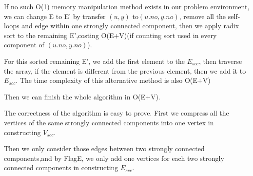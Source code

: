 \documentclass[oneside]{homework} %
\begin{document}
If no such O(1) memory manipulation method exists in our problem environment, we can change E to E' by transfer $(\mathit{u},\mathit{y})$ to$(\mathit{u}.no,\mathit{y}.no)$, remove all the self-loops and edge within one strongly connected component, then we apply radix sort to the remaining E',costing O(E+V)(if counting sort used in every component of $(\mathit{u}.no,\mathit{y}.no)$).

For this sorted remaining E', we add the first element to the $E_{scc}$, then traverse the array, if the element is different from the previous element, then we add it to $E_{scc}$. The time complexity of this alternative method is also O(E+V) 

Then we can finish the whole algorithm in O(E+V). 

The correctness of the algorithm is easy to prove. First we compress all the vertices of the same strongly connected components into one vertex in constructing $V_{scc}$. 

Then we only consider those edges between two strongly connected components,and by FlagE, we only add one vertices for each two strongly connected components in constructing $E_{scc}$.
\end{document}
